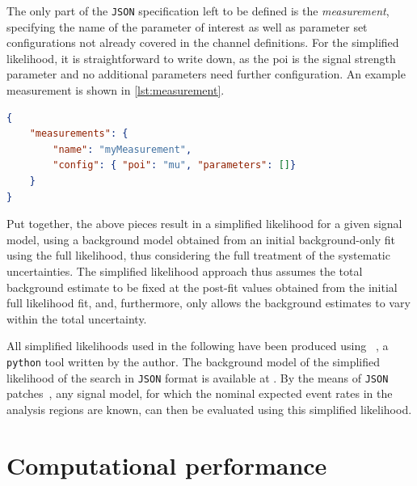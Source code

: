 The only part of the \texttt{JSON} specification left to be defined is the \textit{measurement}, specifying the name of the parameter of interest as well as parameter set configurations not already covered in the channel definitions. For the simplified likelihood, it is straightforward to write down, as the \gls{poi} is the signal strength parameter and no additional parameters need further configuration. An example measurement is shown in \cref{lst:measurement}.

\begin{minipage}{\linewidth}
\begin{lstlisting}[language=json,firstnumber=1,caption={Example of a measurement in the simplified likelihood. The signal strength is the parameter of interest, no additional parameters need further configuration.},captionpos=b, label=lst:measurement]
{
	"measurements": {
		"name": "myMeasurement",
		"config": { "poi": "mu", "parameters": []}
	}	
}
\end{lstlisting}
\end{minipage}

Put together, the above pieces result in a simplified likelihood for a given signal model, using a background model obtained from an initial background-only fit using the full likelihood, thus considering the full treatment of the systematic uncertainties.
The simplified likelihood approach thus assumes the total background estimate to be fixed at the post-fit values obtained from the initial full likelihood fit, and, furthermore, only allows the background estimates to vary within the total uncertainty.

All simplified likelihoods used in the following have been produced using ~\cite{simplify}, a \texttt{python} tool written by the author.
The background model of the simplified likelihood of the \onelepton search in \texttt{JSON} format is available at \cite{simplified_lh_SUSY-2019-08}.
By the means of \texttt{JSON} patches~\cite{json_patch}, any signal model, for which the nominal expected event rates in the analysis regions are known, can then be evaluated using this simplified likelihood.


\section{Computational performance}\label{sec:cpu_performance}

